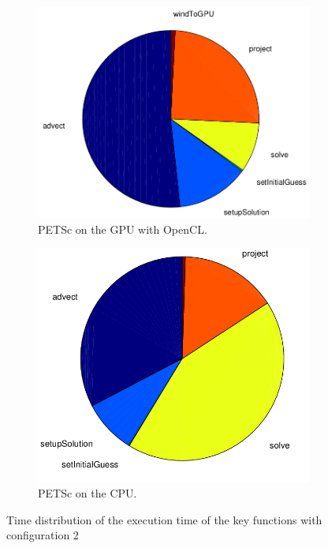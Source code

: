 \begin{figure}[ht]
	\center
	
	\begin{subfigure}{0.45\textwidth}
		\center
		\includegraphics[width=1.0\textwidth]{results/data/td_conf2_petsc_gpu}
		\caption{PETSc on the GPU with OpenCL.}
		\label{fig:td_conf2_petsc_gpu}
	\end{subfigure}
	\begin{subfigure}{0.45\textwidth}
		\center
		\includegraphics[width=1.0\textwidth]{results/data/td_conf2_petsc_cpu}
		\caption{PETSc on the CPU.}
		\label{fig:td_conf2_petsc_cpu}
	\end{subfigure}
	\caption{Time distribution of the execution time of the key functions
			with configuration 2}
	\label{fig:td_conf2}
	
\end{figure}

